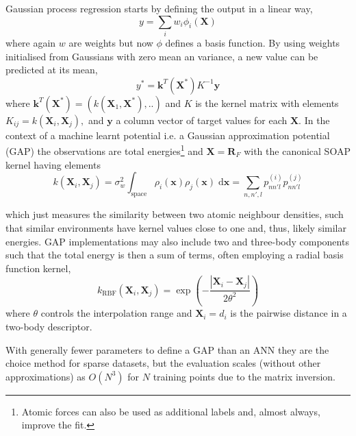 \documentclass[main.tex]{subfiles}
\begin{document}
Gaussian process regression starts by defining the output in a linear way,
\begin{equation}
	y = \sum_i w_i \phi_i(\boldsymbol{X})
\end{equation}
where again $w$ are weights but now $\phi$ defines a basis function. By using weights initialised from Gaussians with zero mean an variance, a new value can be predicted at its mean,\cite{Bartok2015, Williams1996gaussian}
\begin{equation}
	y^* = \boldsymbol{k}^T(\boldsymbol{X}^*) K^{-1} \boldsymbol{y}
\end{equation}
where $ \boldsymbol{k}^T(\boldsymbol{X}^*) = (k(\boldsymbol{X}_1, \boldsymbol{X}^*), ..)$ and $K$ is the kernel matrix with elements $K_{ij} = k(\boldsymbol{X}_i, \boldsymbol{X}_j),$ and $\boldsymbol{y}$ a column vector of target values for each $\boldsymbol{X}$. In the context of a machine learnt potential i.e. a Gaussian approximation potential (GAP) the observations are total energies\footnote{Atomic forces can also be used as additional labels and, almost always, improve the fit.} and $\boldsymbol{X} = \boldsymbol{R}_F$ with the canonical SOAP kernel having elements
\begin{equation}
	k(\boldsymbol{X}_i, \boldsymbol{X}_j) = \sigma_w^2 \int_\text{space} \rho_i (\boldsymbol{x}) \rho_j (\boldsymbol{x})\; \text{d}\boldsymbol{x} = \sum_{n, n', l} p_{nn'l}^{(i)}p_{nn'l}^{(j)} 
\end{equation}

which just measures the similarity between two atomic neighbour densities, such that similar environments have kernel values close to one and, thus, likely similar energies. GAP implementations may also include two and three-body components such that the total energy is then a sum of terms, often employing a radial basis function kernel,
\begin{equation}
	k_\text{RBF}(\boldsymbol{X}_i, \boldsymbol{X}_j) = \exp\left(-\frac{|\boldsymbol{X}_i - \boldsymbol{X}_j|}{2\theta^2}\right)
\end{equation}
where $\theta$ controls the interpolation range and $\boldsymbol{X}_i = d_i$ is the pairwise distance in a two-body descriptor.

With generally fewer parameters to define a GAP than an ANN they are the choice method for sparse datasets, but the evaluation scales (without other approximations) as $O(N^3)$ for $N$ training points due to the matrix inversion.





\clearpage
\end{document}
